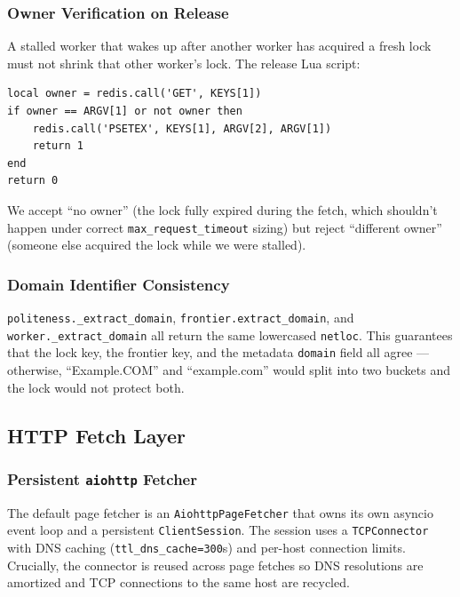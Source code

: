 \documentclass[11pt,a4paper]{article}
\newcommand{\code}[1]{\texttt{#1}}
\begin{document}
\subsubsection{Owner Verification on Release}

A stalled worker that wakes up after another worker has acquired a fresh lock must not shrink that other worker's lock. The release Lua script:

\begin{lstlisting}
local owner = redis.call('GET', KEYS[1])
if owner == ARGV[1] or not owner then
    redis.call('PSETEX', KEYS[1], ARGV[2], ARGV[1])
    return 1
end
return 0
\end{lstlisting}

We accept ``no owner'' (the lock fully expired during the fetch, which shouldn't happen under correct \code{max\_request\_timeout} sizing) but reject ``different owner'' (someone else acquired the lock while we were stalled).

\subsubsection{Domain Identifier Consistency}

\code{politeness.\_extract\_domain}, \code{frontier.extract\_domain}, and \code{worker.\_extract\_domain} all return the same lowercased \code{netloc}. This guarantees that the lock key, the frontier key, and the metadata \code{domain} field all agree --- otherwise, ``Example.COM'' and ``example.com'' would split into two buckets and the lock would not protect both.

\subsection{HTTP Fetch Layer}

\subsubsection{Persistent \code{aiohttp} Fetcher}

The default page fetcher is an \code{AiohttpPageFetcher} that owns its own asyncio event loop and a persistent \code{ClientSession}. The session uses a \code{TCPConnector} with DNS caching (\code{ttl\_dns\_cache=300}s) and per-host connection limits. Crucially, the connector is reused across page fetches so DNS resolutions are amortized and TCP connections to the same host are recycled.
\end{document}
